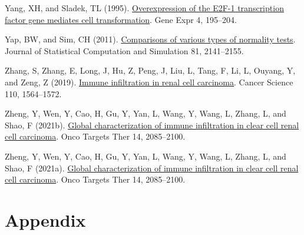 \documentclass[
  parskip,
  oneside]{scrreprt}
\newlength{\cslhangindent}
\newlength{\cslentryspacingunit} %
\newenvironment{CSLReferences}[2] %
 {%
  \setlength{\parindent}{0pt}
  \ifodd #1
  \let\oldpar\par
  \def\par{\hangindent=\cslhangindent\oldpar}
  \fi
  \setlength{\parskip}{#2\cslentryspacingunit}
 }%
 {}
\begin{document}
\begin{CSLReferences}{0}{0}
\leavevmode{}%
Yang, XH, and Sladek, TL (1995).
\href{https://www.ncbi.nlm.nih.gov/pubmed/7787412}{Overexpression of the
E2F-1 transcription factor gene mediates cell transformation}. Gene Expr
4, 195--204.

\leavevmode{}%
Yap, BW, and Sim, CH (2011).
\href{https://doi.org/10.1080/00949655.2010.520163}{Comparisons of
various types of normality tests}. Journal of Statistical Computation
and Simulation 81, 2141--2155.

\leavevmode{}%
Zhang, S, Zhang, E, Long, J, Hu, Z, Peng, J, Liu, L, Tang, F, Li, L,
Ouyang, Y, and Zeng, Z (2019).
\href{https://doi.org/10.1111/cas.13996}{Immune infiltration in renal
cell carcinoma}. Cancer Science 110, 1564--1572.

\leavevmode{}%
Zheng, Y, Wen, Y, Cao, H, Gu, Y, Yan, L, Wang, Y, Wang, L, Zhang, L, and
Shao, F (2021b). \href{https://doi.org/10.2147/ott.S282763}{Global
characterization of immune infiltration in clear cell renal cell
carcinoma}. Onco Targets Ther 14, 2085--2100.

\leavevmode{}%
Zheng, Y, Wen, Y, Cao, H, Gu, Y, Yan, L, Wang, Y, Wang, L, Zhang, L, and
Shao, F (2021a). \href{https://doi.org/10.2147/ott.S282763}{Global
characterization of immune infiltration in clear cell renal cell
carcinoma}. Onco Targets Ther 14, 2085--2100.

\end{CSLReferences}

\hypertarget{appendix}{%
\chapter{Appendix}\label{appendix}}
\end{document}
